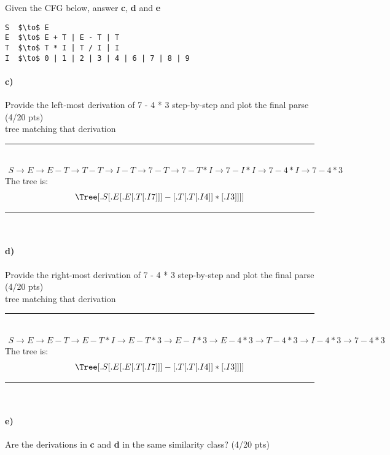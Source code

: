 \documentclass[a4paper,12pt]{article}
\newcommand{\HRule}{\rule{\linewidth}{1mm}}
\begin{document}
\newpage

Given the CFG below, answer \textbf{c}, \textbf{d} and \textbf{e} \\

\begin{lstlisting}[style=output,mathescape=true]
S  $\to$ E
E  $\to$ E + T | E - T | T
T  $\to$ T * I | T / I | I
I  $\to$ 0 | 1 | 2 | 3 | 4 | 6 | 7 | 8 | 9
\end{lstlisting}

\paragraph{c)} Provide the left-most derivation of 7 - 4 * 3 step-by-step and plot the final parse \hfill \small{(4/20 pts)} \\
tree matching that derivation \\

\HRule\\
\begin{align*}
S \to E \to E - T \to T - T \to I - T \to 7 - T \to 7-T*I \to 7-I*I \to 7-4*I \to 7-4*3
\end{align*}
The tree is:
\begin{align*}
\Tree [.S [.E [.E [.T [.I 7 ] ] ] - [.T [.T [.I 4 ] ] * [.I 3 ] ] ] ] \\
\end{align*}
\HRule\\

\paragraph{d)} Provide the right-most derivation of 7 - 4 * 3 step-by-step and plot the final parse \hfill \small{(4/20 pts)} \\
 tree matching that derivation \\
 
\HRule\\
\begin{align*}
S \to E \to E - T \to E-T*I \to E-T*3 \to E-I*3 \to E-4*3 \to T-4*3 \to I-4*3 \to 7-4*3
\end{align*}
The tree is:
\begin{align*}
\Tree [.S [.E [.E [.T [.I 7 ] ] ] - [.T [.T [.I 4 ] ] * [.I 3 ] ] ] ] \\
\end{align*}
\HRule\\


\paragraph{e)} Are the derivations in \textbf{c} and \textbf{d} in the same similarity class?  \hfill \small{(4/20 pts)} \\
\end{document}
